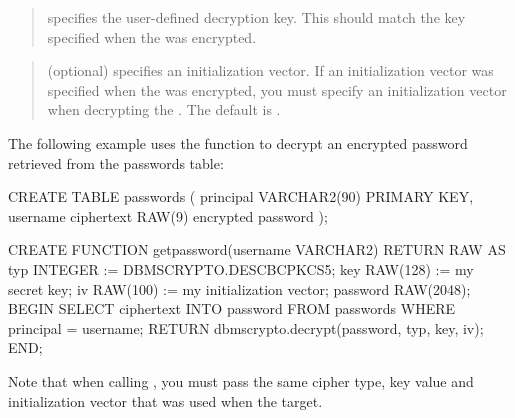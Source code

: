 \documentclass[letterpaper,10pt,english,openany,oneside]{sphinxmanual}
\begin{document}
\newpage

\begin{quote}

 specifies the user-defined decryption key. This should match
the key specified when the  was encrypted.
\end{quote}

\begin{quote}

 (optional) specifies an initialization vector. If an
initialization vector was specified when the  was encrypted,
you must specify an initialization vector when decrypting the .
The default is .
\end{quote}


The following example uses the  function to decrypt
an encrypted password retrieved from the passwords table:

%
\begin{sphinxVerbatim}[commandchars=\\\{\}]
CREATE TABLE passwords
(
   principal VARCHAR2(90) PRIMARY KEY, \PYGZhy{}\PYGZhy{} username
   ciphertext RAW(9) \PYGZhy{}\PYGZhy{} encrypted password
);

CREATE FUNCTION get\PYGZus{}password(username VARCHAR2) RETURN RAW AS
 typ       INTEGER := DBMS\PYGZus{}CRYPTO.DES\PYGZus{}CBC\PYGZus{}PKCS5;
 key       RAW(128) := \PYGZsq{}my secret key\PYGZsq{};
 iv        RAW(100) := \PYGZsq{}my initialization vector\PYGZsq{};
 password  RAW(2048);
 BEGIN
   SELECT ciphertext INTO password FROM passwords WHERE principal =
   username;
   RETURN dbms\PYGZus{}crypto.decrypt(password, typ, key, iv);
 END;
\end{sphinxVerbatim}

Note that when calling , you must pass the same cipher type, key
value and initialization vector that was used when  the
target.

\newpage
\end{document}
